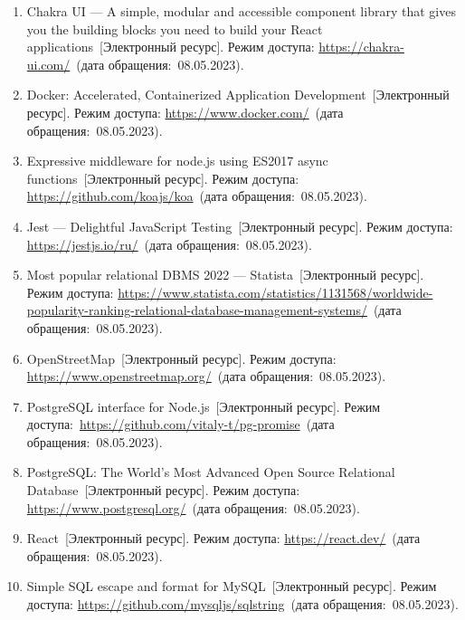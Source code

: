 \begin{enumerate}
    \item \label{chakra} Chakra UI --- A simple, modular and accessible component library that gives you the building blocks you need to build your React applications~[Электронный ресурс]. Режим доступа: \url{https://chakra-ui.com/}~(дата обращения:~08.05.2023).
    \item \label{docker} Docker: Accelerated, Containerized Application Development~[Электронный ресурс]. Режим доступа: \url{https://www.docker.com/}~(дата обращения:~08.05.2023).
    \item \label{koa} Expressive middleware for node.js using ES2017 async functions~[Электронный ресурс]. Режим доступа: \url{https://github.com/koajs/koa}~(дата обращения:~08.05.2023).
    \item \label{jest} Jest --- Delightful JavaScript Testing~[Электронный ресурс]. Режим доступа: \url{https://jestjs.io/ru/}~(дата обращения:~08.05.2023).
    \item \label{dmbs} Most popular relational DBMS 2022 --- Statista~[Электронный ресурс]. Режим доступа: \url{https://www.statista.com/statistics/1131568/worldwide-popularity-ranking-relational-database-management-systems/}~(дата обращения:~08.05.2023).
    \item \label{osm} OpenStreetMap~[Электронный ресурс]. Режим доступа: \url{https://www.openstreetmap.org/}~(дата обращения:~08.05.2023).
    \item \label{pg-promise} PostgreSQL interface for Node.js~[Электронный ресурс]. Режим доступа:~\url{https://github.com/vitaly-t/pg-promise}~(дата обращения:~08.05.2023).
    \item \label{postgres} PostgreSQL: The World's Most Advanced Open Source Relational Database~[Электронный ресурс]. Режим доступа: \url{https://www.postgresql.org/}~(дата обращения:~08.05.2023).
    \item \label{react} React~[Электронный ресурс]. Режим доступа: \url{https://react.dev/}~(дата обращения:~08.05.2023).
    \item \label{sqlstring} Simple SQL escape and format for MySQL~[Электронный ресурс]. Режим доступа: \url{https://github.com/mysqljs/sqlstring}~(дата обращения:~08.05.2023).
\end{enumerate}